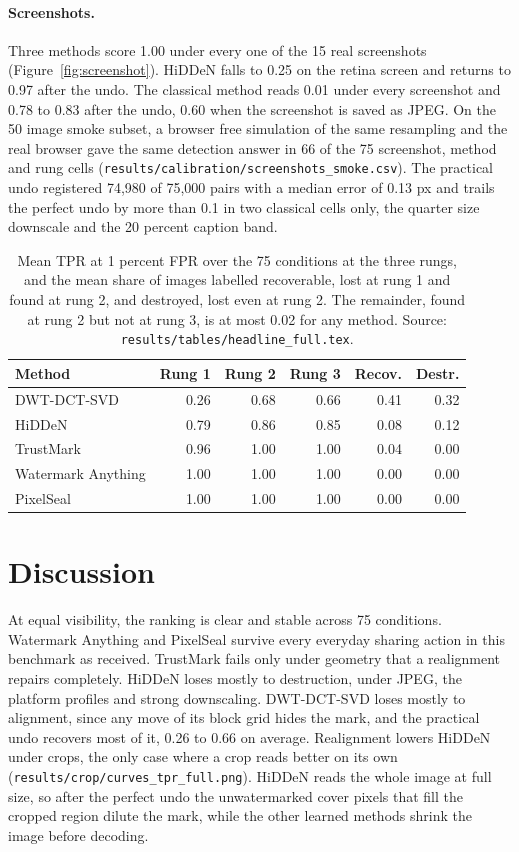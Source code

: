 \documentclass[10pt,twocolumn]{article}
\newcommand{\rf}[1]{\texttt{\small #1}}
\begin{document}
\paragraph{Screenshots.} 
Three methods score 1.00 under every one of the 15 real screenshots (Figure~\ref{fig:screenshot}). HiDDeN falls to 0.25 on the retina screen and returns to 0.97 after the undo. The classical method reads 0.01 under every screenshot and 0.78 to 0.83 after the undo, 0.60 when the screenshot is saved as JPEG. On the 50 image smoke subset, a browser free simulation of the same resampling and the real browser gave the same detection answer in 66 of the 75 screenshot, method and rung cells (\rf{results/calibration/screenshots\_smoke.csv}).
The practical undo registered 74,980 of 75,000 pairs with a median error of 0.13 px and trails the perfect undo by more than 0.1 in two
classical cells only, the quarter size downscale and the 20 percent caption band.

\begin{table}[t]
\centering\footnotesize
\setlength{\tabcolsep}{2.5pt}
\begin{tabular}{lrrrrr}
\toprule
Method & Rung 1 & Rung 2 & Rung 3 & Recov. & Destr. \\
\midrule
DWT-DCT-SVD & 0.26 & 0.68 & 0.66 & 0.41 & 0.32 \\
HiDDeN & 0.79 & 0.86 & 0.85 & 0.08 & 0.12 \\
TrustMark & 0.96 & 1.00 & 1.00 & 0.04 & 0.00 \\
Watermark Anything & 1.00 & 1.00 & 1.00 & 0.00 & 0.00 \\
PixelSeal & 1.00 & 1.00 & 1.00 & 0.00 & 0.00 \\
\bottomrule
\end{tabular}
\caption{Mean TPR at 1 percent FPR over the 75 conditions at the three rungs, and the mean share of images labelled recoverable, lost at rung 1 and found at rung 2, and destroyed, lost even at rung 2. The remainder, found at rung 2 but not at rung 3, is at most 0.02 for any method. Source: \rf{results/tables/headline\_full.tex}.}
\label{tab:mean_TPR_table}
\end{table}

\section{Discussion}
At equal visibility, the ranking is clear and stable across 75 conditions. Watermark Anything and PixelSeal survive every
everyday sharing action in this benchmark as received. TrustMark fails only under geometry that a realignment repairs
completely. HiDDeN loses mostly to destruction, under JPEG, the platform profiles and strong downscaling. DWT-DCT-SVD loses mostly to alignment, since any move of its block grid hides the mark, and the practical undo recovers most of it, 0.26 to 0.66 on average.
Realignment lowers HiDDeN under crops, the only case where a crop reads better on its own (\rf{results/crop/curves\_tpr\_full.png}). HiDDeN reads the whole image at full size, so after the perfect undo the unwatermarked cover pixels that fill the cropped region dilute the mark, while the other learned methods shrink the image before decoding.
\end{document}
